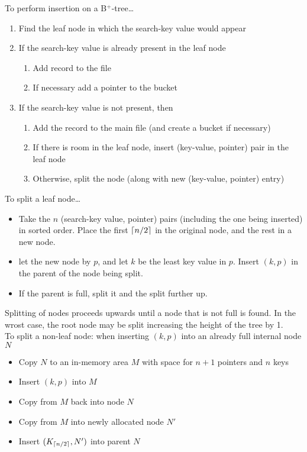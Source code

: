 \documentclass{article}
\begin{document}
To perform insertion on a B$^{+}$-tree\dots 
\begin{enumerate}
  \item Find the leaf node in which the search-key value would appear 
  \item If the search-key value is already present in the leaf node 
    \begin{enumerate}
      \item Add record to the file 
      \item If necessary add a pointer to the bucket 
    \end{enumerate}
  \item If the search-key value is not present, then  
    \begin{enumerate}
      \item Add the record to the main file (and create a bucket if necessary) 
      \item If there is room in the leaf node, insert (key-value, pointer) pair in the leaf node 
      \item Otherwise, split the node (along with new (key-value, pointer) entry) 
    \end{enumerate}
\end{enumerate}
To split a leaf node\dots 
\begin{itemize}
  \item Take the $n$ (search-key value, pointer) pairs (including the one being inserted) in sorted order. Place the first $\left\lceil n/2 \right\rceil$ in the original node, and the rest in a new node. 
  \item let the new node by $p$, and let $k$ be the least key value in $p$. Insert $(k,p)$ in the parent of the node being split. 
  \item If the parent is full, split it and  the split further up. 
\end{itemize}
Splitting of nodes proceeds upwards until a node that is not full is found. In the wrost case, the root node may be split increasing the height of the tree by 1. \\ 

To split a non-leaf node: when inserting $(k,p)$ into an already full internal node $N$ 
\begin{itemize}
  \item Copy $N$ to an in-memory area $M$ with space for $n+1$ pointers and $n$ keys 
  \item Insert $(k,p)$ into $M$ 
  \item Copy from $M$ back into node $N$ 
  \item Copy from $M$ into newly allocated node $N'$ 
  \item Insert $(K_{\left\lceil n/2 \right\rceil}, N')$ into parent $N$
\end{itemize}
\end{document}
